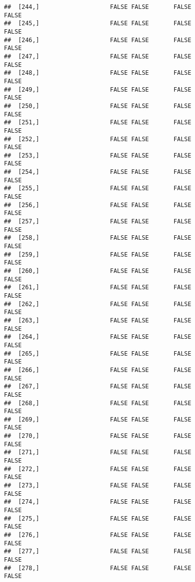 \documentclass[
]{article}
\begin{document}
\begin{verbatim}
##  [244,]                    FALSE FALSE       FALSE                FALSE
##  [245,]                    FALSE FALSE       FALSE                FALSE
##  [246,]                    FALSE FALSE       FALSE                FALSE
##  [247,]                    FALSE FALSE       FALSE                FALSE
##  [248,]                    FALSE FALSE       FALSE                FALSE
##  [249,]                    FALSE FALSE       FALSE                FALSE
##  [250,]                    FALSE FALSE       FALSE                FALSE
##  [251,]                    FALSE FALSE       FALSE                FALSE
##  [252,]                    FALSE FALSE       FALSE                FALSE
##  [253,]                    FALSE FALSE       FALSE                FALSE
##  [254,]                    FALSE FALSE       FALSE                FALSE
##  [255,]                    FALSE FALSE       FALSE                FALSE
##  [256,]                    FALSE FALSE       FALSE                FALSE
##  [257,]                    FALSE FALSE       FALSE                FALSE
##  [258,]                    FALSE FALSE       FALSE                FALSE
##  [259,]                    FALSE FALSE       FALSE                FALSE
##  [260,]                    FALSE FALSE       FALSE                FALSE
##  [261,]                    FALSE FALSE       FALSE                FALSE
##  [262,]                    FALSE FALSE       FALSE                FALSE
##  [263,]                    FALSE FALSE       FALSE                FALSE
##  [264,]                    FALSE FALSE       FALSE                FALSE
##  [265,]                    FALSE FALSE       FALSE                FALSE
##  [266,]                    FALSE FALSE       FALSE                FALSE
##  [267,]                    FALSE FALSE       FALSE                FALSE
##  [268,]                    FALSE FALSE       FALSE                FALSE
##  [269,]                    FALSE FALSE       FALSE                FALSE
##  [270,]                    FALSE FALSE       FALSE                FALSE
##  [271,]                    FALSE FALSE       FALSE                FALSE
##  [272,]                    FALSE FALSE       FALSE                FALSE
##  [273,]                    FALSE FALSE       FALSE                FALSE
##  [274,]                    FALSE FALSE       FALSE                FALSE
##  [275,]                    FALSE FALSE       FALSE                FALSE
##  [276,]                    FALSE FALSE       FALSE                FALSE
##  [277,]                    FALSE FALSE       FALSE                FALSE
##  [278,]                    FALSE FALSE       FALSE                FALSE

\end{verbatim}
\end{document}
